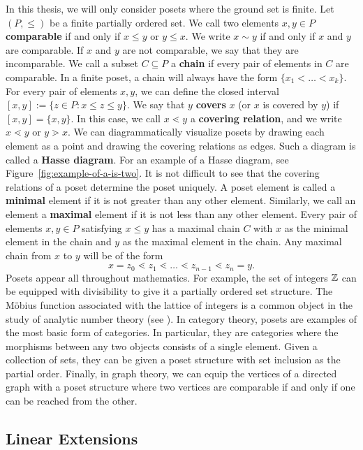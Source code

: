 \documentclass{puthesis-UG}
\begin{document}
In this thesis, we will only consider posets where the ground set is finite. Let $(P, \leq)$ be a finite partially ordered set. We call two elements $x, y \in P$ \textbf{comparable} if and only if $x \leq y$ or $y \leq x$. We write $x \sim y$ if and only if $x$ and $y$ are comparable. If $x$ and $y$ are not comparable, we say that they are incomparable. We call a subset $C \subseteq P$ a \textbf{chain} if every pair of elements in $C$ are comparable. In a finite poset, a chain will always have the form $\{x_1 < \ldots < x_k\}$. For every pair of elements $x, y$, we can define the closed interval $[x, y] := \{z \in P : x \leq z \leq y\}$. We say that $y$ \textbf{covers} $x$ (or $x$ is covered by $y$) if $[x, y] = \{x, y\}$. In this case, we call $x \lessdot y$ a \textbf{covering relation}, and we write $x \lessdot y$ or $y \gtrdot x$. We can diagrammatically visualize posets by drawing each element as a point and drawing the covering relations as edges. Such a diagram is called a \textbf{Hasse diagram}. For an example of a Hasse diagram, see Figure~\ref{fig:example-of-a-is-two}. It is not difficult to see that the covering relations of a poset determine the poset uniquely. A poset element is called a \textbf{minimal} element if it is not greater than any other element. Similarly, we call an element a \textbf{maximal} element if it is not less than any other element. Every pair of elements $x, y \in P$ satisfying $x \leq y$ has a maximal chain $C$ with $x$ as the minimal element in the chain and $y$ as the maximal element in the chain. Any maximal chain from $x$ to $y$ will be of the form 
\[
	x = z_0 \lessdot z_1 \lessdot \ldots \lessdot z_{n-1} \lessdot z_n = y. 
\]
Posets appear all throughout mathematics. For example, the set of integers $\mathbb{Z}$ can be equipped with divisibility to give it a partially ordered set structure. The M\"obius function associated with the lattice of integers is a common object in the study of analytic number theory (see \cite{Apostol2013-an}). In category theory, posets are examples of the most basic form of categories. In particular, they are categories where the morphisms between any two objects consists of a single element. Given a collection of sets, they can be given a poset structure with set inclusion as the partial order. Finally, in graph theory, we can equip the vertices of a directed graph with a poset structure where two vertices are comparable if and only if one can be reached from the other. 

\subsection{Linear Extensions}
\end{document}
